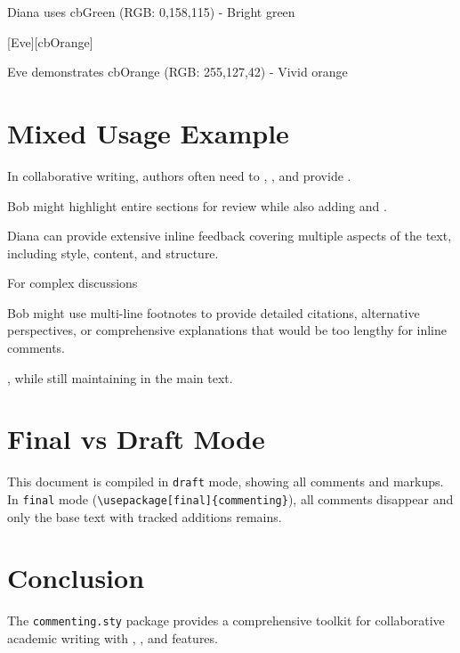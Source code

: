 \documentclass{article}
\begin{document}
\begin{dianaenv}
    Diana uses cbGreen (RGB: 0,158,115) - Bright green
\end{dianaenv}

[Eve][cbOrange]
\begin{eveenv}
    Eve demonstrates cbOrange (RGB: 255,127,42) - Vivid orange
\end{eveenv}

\section{Mixed Usage Example}

In collaborative writing, authors often need to , , and provide .

\begin{bobenv}
    Bob might highlight entire sections for review while also adding  and .
\end{bobenv}

\begin{dianaienv}
    Diana can provide extensive inline feedback
    covering multiple aspects of the text,
    including style, content, and structure.
\end{dianaienv}

For complex discussions\begin{bobfenv}
    Bob might use multi-line footnotes
    to provide detailed citations,
    alternative perspectives,
    or comprehensive explanations
    that would be too lengthy for inline comments.
\end{bobfenv}, while still maintaining  in the main text.

\section{Final vs Draft Mode}

This document is compiled in \texttt{draft} mode, showing all comments and markups. In \texttt{final} mode (\texttt{\textbackslash usepackage[final]\{commenting\}}), all comments disappear and only the base text with tracked additions remains.

\section{Conclusion}

The \texttt{commenting.sty} package provides a comprehensive toolkit for collaborative academic writing with , , and  features.
\end{document}
